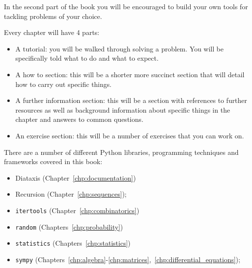 In the second part of the book you will be encouraged to build your own tools
for tackling problems of your choice.

Every chapter will have 4 parts:

\begin{itemize}
\item A tutorial: you will be walked through solving a problem. You will be
specifically told what to do and what to expect.

\item A how to section: this will be a shorter more succinct section that will
detail how to carry out specific things.

\item 
A further information section: this will be a section with references to
further resources as well as background information about specific things in
the chapter and answers to common questions.

\item
An exercise section: this will be a number of exercises that you can work on.

\end{itemize}

There are a number of different Python libraries, programming techniques and frameworks covered in this
book:

\begin{itemize}
    \item Diataxis (Chapter~\ref{chp:documentation})
    \item Recursion (Chapter~\ref{chp:sequences});
    \item \texttt{itertools} (Chapter~\ref{chp:combinatorics})
    \item \texttt{random} (Chapters~\ref{chp:probability})
    \item \texttt{statistics} (Chapters~\ref{chp:statistics})
    \item \texttt{sympy} (Chapters~\ref{chp:algebra}-\ref{chp:matrices},~\ref{chp:differential_equations});
\end{itemize}


